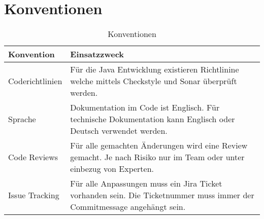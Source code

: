 \section{Konventionen}

\begin{table}[H]
	\centering
	\caption{Konventionen}
	\begin{tabular}{ | p{4cm} | p{12cm} | }
		\toprule
		{\textbf{Konvention}} & {\textbf{Einsatzzweck}} \\
		\midrule
		Coderichtlinien & Für die Java Entwicklung existieren Richtlinine welche mittels Checkstyle und Sonar überprüft werden. \\ \hline
		Sprache & Dokumentation im Code ist Englisch. Für technische Dokumentation kann Englisch oder Deutsch verwendet werden.\\ \hline
		Code Reviews & Für alle gemachten Änderungen wird eine Review gemacht. Je nach Risiko nur im Team oder unter einbezug von Experten.\\ \hline
		Issue Tracking & Für alle Anpassungen muss ein Jira Ticket vorhanden sein. Die Ticketnummer muss immer der Commitmessage angehängt sein.\\	
		\bottomrule
	\end{tabular}
\end{table}